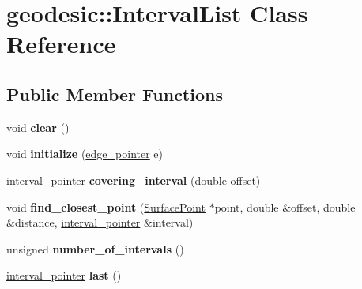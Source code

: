 \hypertarget{classgeodesic_1_1_interval_list}{}\section{geodesic\+:\+:Interval\+List Class Reference}
\label{classgeodesic_1_1_interval_list}
\subsection*{Public Member Functions}
\begin{DoxyCompactItemize}
\item 
\hypertarget{classgeodesic_1_1_interval_list_a006cc5985d16b3f007087e9f0e6f2be8}{}void {\bfseries clear} ()\label{classgeodesic_1_1_interval_list_a006cc5985d16b3f007087e9f0e6f2be8}

\item 
\hypertarget{classgeodesic_1_1_interval_list_a14de20c6cb848f62ff7dd48703c648f9}{}void {\bfseries initialize} (\hyperlink{classgeodesic_1_1_edge}{edge\+\_\+pointer} e)\label{classgeodesic_1_1_interval_list_a14de20c6cb848f62ff7dd48703c648f9}

\item 
\hypertarget{classgeodesic_1_1_interval_list_a3852850ab228257160ea1999a6ceeb6b}{}\hyperlink{classgeodesic_1_1_interval}{interval\+\_\+pointer} {\bfseries covering\+\_\+interval} (double offset)\label{classgeodesic_1_1_interval_list_a3852850ab228257160ea1999a6ceeb6b}

\item 
\hypertarget{classgeodesic_1_1_interval_list_a4d4da04f7be984dc4170a7904e0092cf}{}void {\bfseries find\+\_\+closest\+\_\+point} (\hyperlink{classgeodesic_1_1_surface_point}{Surface\+Point} $\ast$point, double \&offset, double \&distance, \hyperlink{classgeodesic_1_1_interval}{interval\+\_\+pointer} \&interval)\label{classgeodesic_1_1_interval_list_a4d4da04f7be984dc4170a7904e0092cf}

\item 
\hypertarget{classgeodesic_1_1_interval_list_a473a9e225447eb4ef46bf92e51f9fa71}{}unsigned {\bfseries number\+\_\+of\+\_\+intervals} ()\label{classgeodesic_1_1_interval_list_a473a9e225447eb4ef46bf92e51f9fa71}

\item 
\hypertarget{classgeodesic_1_1_interval_list_a132bd289ce2094f8799262b05867f618}{}\hyperlink{classgeodesic_1_1_interval}{interval\+\_\+pointer} {\bfseries last} ()\label{classgeodesic_1_1_interval_list_a132bd289ce2094f8799262b05867f618}


\end{DoxyCompactItemize}
